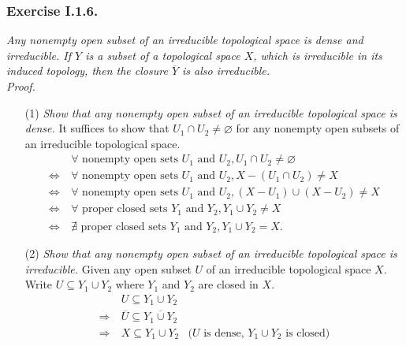 \documentclass{article}
\begin{document}



\subsubsection*{Exercise I.1.6.}
\emph{Any nonempty open subset of an irreducible topological space is dense and irreducible.
If $Y$ is a subset of a topological space $X$, which is irreducible in its induced topology,
then the closure $\overline{Y}$ is also irreducible.} \\



\emph{Proof.}
\begin{enumerate}
\item[(1)]
\emph{Show that any nonempty open subset of an irreducible topological space
is dense.}
It suffices to show that $U_1 \cap U_2 \neq \varnothing$ for any
nonempty open subsets of an irreducible topological space.
  \begin{align*}
  & \: \forall \text{ nonempty open sets } U_1 \text{ and } U_2,
  U_1 \cap U_2 \neq \varnothing \\
  \Longleftrightarrow& \:
  \forall \text{ nonempty open sets } U_1 \text{ and } U_2,
  X - (U_1 \cap U_2) \neq X \\
  \Longleftrightarrow& \:
  \forall \text{ nonempty open sets } U_1 \text{ and } U_2,
  (X - U_1) \cup (X - U_2) \neq X \\
  \Longleftrightarrow& \:
  \forall \text{ proper closed sets } Y_1 \text{ and } Y_2,
  Y_1 \cup Y_2 \neq X \\
  \Longleftrightarrow& \:
  \nexists \text{ proper closed sets } Y_1 \text{ and } Y_2,
  Y_1 \cup Y_2 = X.
  \end{align*}
\item[(2)]
\emph{Show that any nonempty open subset of an irreducible topological space
is irreducible.}
Given any open subset $U$ of an irreducible topological space $X$.
Write $U \subseteq Y_1 \cup Y_2$ where $Y_1$ and $Y_2$ are closed in $X$.
  \begin{align*}
  & \: U \subseteq Y_1 \cup Y_2 \\
  \Longrightarrow& \:
  \overline{U} \subseteq \overline{Y_1 \cup Y_2} \\
  \Longrightarrow& \:
  X \subseteq Y_1 \cup Y_2
    &\text{($U$ is dense, $Y_1 \cup Y_2$ is closed)} \\

\end{align*}
\end{enumerate}
\end{document}
